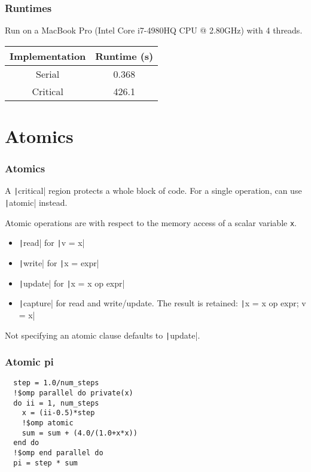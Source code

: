 \documentclass{beamer}
\begin{document}
\begin{frame}
\frametitle{Runtimes}
Run on a MacBook Pro (Intel Core i7-4980HQ CPU @ 2.80GHz) with 4 threads.

\begin{table}
\begin{tabular}{cc}
\toprule
Implementation & Runtime (s) \\
\midrule
Serial   & 0.368 \\
Critical & 426.1 \\
\bottomrule
\end{tabular}
\end{table}
\end{frame}

\section{Atomics}
\begin{frame}[fragile]
\frametitle{Atomics}
A \texttt|critical| region protects a whole block of code. For a single operation, can use \texttt|atomic| instead.

Atomic operations are with respect to the memory access of a scalar variable {\tt x}.

\begin{itemize}
  \item \texttt|read| for \texttt|v = x|
  \item \texttt|write| for \texttt|x = expr|
  \item \texttt|update| for \texttt|x = x op expr|
  \item \texttt|capture| for read and write/update. The result is retained: \texttt|x = x op expr; v = x|
\end{itemize}

Not specifying an atomic clause defaults to \texttt|update|.
\end{frame}

\begin{frame}[fragile]
\frametitle{Atomic pi}
\begin{verbatim}
  step = 1.0/num_steps
  !$omp parallel do private(x)
  do ii = 1, num_steps
    x = (ii-0.5)*step
    !$omp atomic
    sum = sum + (4.0/(1.0+x*x))
  end do
  !$omp end parallel do
  pi = step * sum
\end{verbatim}
\end{frame}
\end{document}
